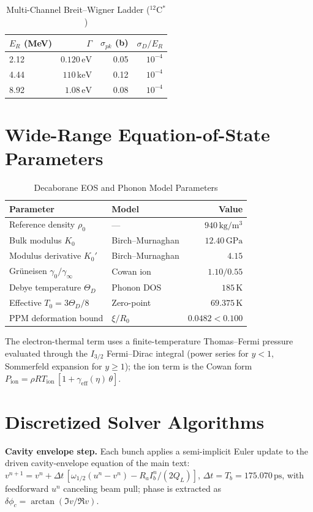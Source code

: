 \documentclass[10pt,journal,compsoc]{IEEEtran}
\newcommand{\ps}{\,\mathrm{ps}}
\begin{document}
\begin{table}[h]
\centering
\caption{Multi-Channel Breit--Wigner Ladder ($^{12}$C$^{*}$)}
\label{tab:bw_p4}
\begin{tabular}{lrrr}
\toprule
$E_R$ (MeV) & $\Gamma$ & $\sigma_{pk}$ (b) & $\sigma_D/E_R$ \\
\midrule
2.12 & $0.120\,\mathrm{eV}$ & 0.05 & $10^{-4}$ \\
4.44 & $110\,\mathrm{keV}$ & 0.12 & $10^{-4}$ \\
8.92 & $1.08\,\mathrm{eV}$ & 0.08 & $10^{-4}$ \\
\bottomrule
\end{tabular}
\end{table}

\section{Wide-Range Equation-of-State Parameters}
\label{app:eos}
\begin{table}[h]
\centering
\caption{Decaborane EOS and Phonon Model Parameters}
\begin{tabular}{llr}
\toprule
\textbf{Parameter} & \textbf{Model} & \textbf{Value} \\
\midrule
Reference density $\rho_0$ & --- & $940\,\mathrm{kg/m^3}$ \\
Bulk modulus $K_0$ & Birch--Murnaghan & $12.40\,\mathrm{GPa}$ \\
Modulus derivative $K_0'$ & Birch--Murnaghan & $4.15$ \\
Gr\"uneisen $\gamma_0 / \gamma_\infty$ & Cowan ion & $1.10 / 0.55$ \\
Debye temperature $\Theta_D$ & Phonon DOS & $185\,\mathrm{K}$ \\
Effective $T_0 = 3\Theta_D/8$ & Zero-point & $69.375\,\mathrm{K}$ \\
PPM deformation bound & $\xi/R_0$ & $0.0482 < 0.100$ \\
\bottomrule
\end{tabular}
\end{table}
The electron-thermal term uses a finite-temperature Thomas--Fermi
pressure evaluated through the $I_{3/2}$ Fermi--Dirac integral (power
series for $y<1$, Sommerfeld expansion for $y\ge 1$); the ion term is
the Cowan form $P_{\mathrm{ion}} = \rho R T_{\mathrm{ion}}\,
[1 + \gamma_{\mathrm{eff}}(\eta)\,\theta]$.



\section{Discretized Solver Algorithms}
\label{app:algorithms}
\textbf{Cavity envelope step.} Each bunch applies a semi-implicit Euler
update to the driven cavity-envelope equation of the main text:
$v^{n+1} = v^n + \Delta t\,[\omega_{1/2}(u^n - v^n) - R_a I_b^n/(2Q_L)]$,
$\Delta t = T_b = 175.070\ps$, with feedforward $u^n$ canceling beam
pull; phase is extracted as $\delta\phi_c = \arctan(\Im v / \Re v)$.
\end{document}
